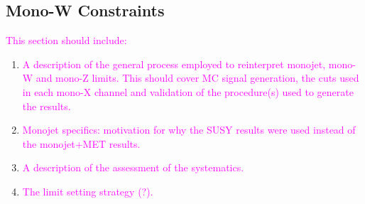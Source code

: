 \subsection{Mono-W Constraints}
\begin{flushleft}
\end{flushleft}

\begin{flushleft}
\textcolor{magenta}{This section should include:}
\begin{enumerate}
\item \textcolor{magenta}{A description of the general process employed to reinterpret monojet, mono-W and mono-Z limits. This should cover MC signal generation, the cuts used in each mono-X channel and validation of the procedure(s) used to generate the results.}
\item \textcolor{magenta}{Monojet specifics: motivation for why the SUSY results were used instead of the monojet+MET results.}
\item \textcolor{magenta}{A description of the assessment of the systematics.}
\item \textcolor{magenta}{The limit setting strategy (?).}
\end{enumerate}
\end{flushleft}
